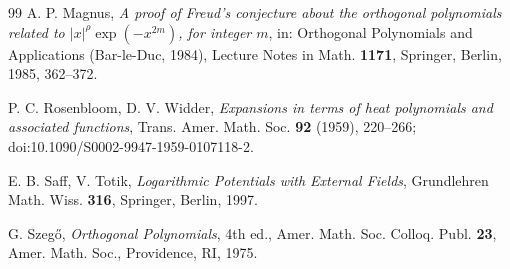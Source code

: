 \documentclass[11pt]{amsart}
\theoremstyle{definition}
\theoremstyle{remark}
\numberwithin{equation}{section}
\begin{document}
\begin{thebibliography}{99}
 A. P. Magnus, \emph{A proof of Freud's conjecture about the orthogonal polynomials related to $|x|^\rho\exp(-x^{2m})$, for integer $m$}, in: Orthogonal Polynomials and Applications (Bar-le-Duc, 1984), Lecture Notes in Math. \textbf{1171}, Springer, Berlin, 1985, 362--372.

 P. C. Rosenbloom, D. V. Widder, \emph{Expansions in terms of heat polynomials and associated functions}, Trans. Amer. Math. Soc. \textbf{92} (1959), 220--266; doi:10.1090/S0002-9947-1959-0107118-2.

 E. B. Saff, V. Totik, \emph{Logarithmic Potentials with External Fields}, Grundlehren Math. Wiss. \textbf{316}, Springer, Berlin, 1997.

 G. Szeg\H{o}, \emph{Orthogonal Polynomials}, 4th ed., Amer. Math. Soc. Colloq. Publ. \textbf{23}, Amer. Math. Soc., Providence, RI, 1975.

\end{thebibliography}
\end{document}
